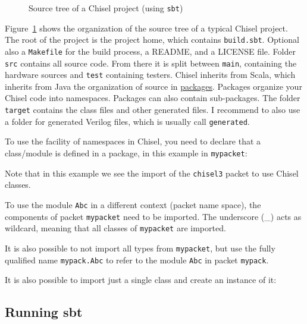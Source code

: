 \documentclass[%
    10pt, %
    headinclude, footexclude,
    openright, %
    notitlepage,
    cleardoubleempty,
    headsepline,
    pointlessnumbers,
    bibtotoc, idxtotoc,
    ]{scrbook}
\newcommand{\code}[1]{{\small{\texttt{#1}}}}
\newcommand{\myref}[2]{\href{#1}{#2}}
\begin{document}
\begin{figure}
\caption{Source tree of a Chisel project (using \code{sbt})}
\label{fig:folders}
\end{figure}

Figure~\ref{fig:folders} shows the organization of the source tree of a typical Chisel project.
The root of the project is the project home, which contains \code{build.sbt}.
Optional also a \code{Makefile} for the build process, a README, and a LICENSE file.
Folder \code{src} contains all source code. From there it is split between \code{main},
containing the hardware sources and \code{test} containing testers.
Chisel inherits from Scala, which inherits from Java the organization of source
in \myref{https://en.wikipedia.org/wiki/Java_package}{packages}.
Packages organize your Chisel code into namespaces. Packages can also contain
sub-packages.
The folder \code{target} contains the class files and other generated files.
I recommend to also use a folder for generated Verilog files, which is usually
call \code{generated}.


To use the facility of namespaces in Chisel, you need to declare that a class/module
is defined in a package, in this example in \code{mypacket}:



\noindent Note that in this example we see the import of the \code{chisel3} packet
to use Chisel classes.

To use the module \code{Abc} in a different context (packet name space),
the components of packet \code{mypacket} need to be imported. The underscore
(\_) acts as wildcard, meaning that all classes of \code{mypacket} are imported.



\noindent It is also possible to not import all types from \code{mypacket},
but use the fully qualified name \code{mypack.Abc} to refer to the module
\code{Abc} in packet \code{mypack}.



\noindent It is also possible to import just a single class and create an instance of it:




\subsection{Running sbt}
\end{document}
